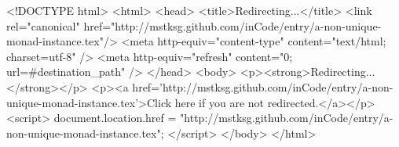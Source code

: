 <!DOCTYPE html>
<html>
<head>
<title>Redirecting...</title>
<link rel="canonical" href="http://mstksg.github.com/inCode/entry/a-non-unique-monad-instance.tex"/>
<meta http-equiv="content-type" content="text/html; charset=utf-8" />
<meta http-equiv="refresh" content="0; url=#{destination_path}" />
</head>
<body>
  <p><strong>Redirecting...</strong></p>
  <p><a href='http://mstksg.github.com/inCode/entry/a-non-unique-monad-instance.tex'>Click here if you are not redirected.</a></p>
  <script>
    document.location.href = "http://mstksg.github.com/inCode/entry/a-non-unique-monad-instance.tex";
  </script>
</body>
</html>
